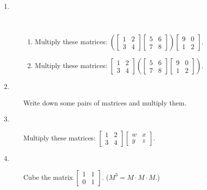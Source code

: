 \documentclass{article}
\begin{document}
\begin{description}

  \item[1.] $\ $
    \begin{enumerate}[\hspace{1cm}(a)]
      \item Multiply these matrices: $\left( \begin{bmatrix} 1 & 2 \\ 3 & 4 \end{bmatrix}  \begin{bmatrix} 5 & 6 \\ 7 & 8 \end{bmatrix} \right)  \begin{bmatrix} 9 & 0 \\ 1 & 2 \end{bmatrix}$.
      \item Multiply these matrices: $\begin{bmatrix} 1 & 2 \\ 3 &4 \end{bmatrix}  \left( \begin{bmatrix} 5 & 6 \\ 7 & 8 \end{bmatrix}  \begin{bmatrix} 9 & 0 \\ 1 & 2 \end{bmatrix} \right)$. 
    \end{enumerate}

  \item[2.] Write down some pairs of matrices and multiply them. 

  \item[3.] Multiply these matrices: $\begin{bmatrix} 1 & 2 \\ 3 & 4 \end{bmatrix}  \begin{bmatrix} w & x \\ y & z \end{bmatrix}$. 

  \item[4.] Cube the matrix $\begin{bmatrix} 1 & 1 \\ 0 & 1 \end{bmatrix}$. ($M^3 = M \cdot M \cdot M$.)


\end{description}
\end{document}
